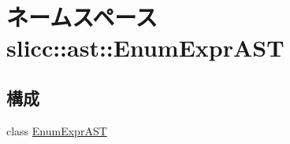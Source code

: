 \hypertarget{namespaceslicc_1_1ast_1_1EnumExprAST}{
\section{ネームスペース slicc::ast::EnumExprAST}
\label{namespaceslicc_1_1ast_1_1EnumExprAST}
}
\subsection*{構成}
\begin{DoxyCompactItemize}
\item 
class \hyperlink{classslicc_1_1ast_1_1EnumExprAST_1_1EnumExprAST}{EnumExprAST}
\end{DoxyCompactItemize}
